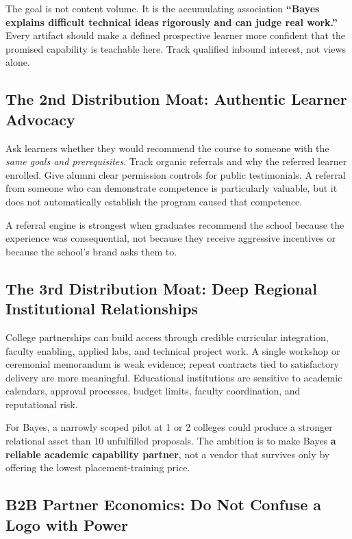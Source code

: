 The goal is not content volume. It is the accumulating association \textbf{``Bayes explains difficult technical ideas rigorously and can judge real work.''} Every artifact should make a defined prospective learner more confident that the promised capability is teachable here. Track qualified inbound interest, not views alone.

\subsection{The 2nd Distribution Moat: Authentic Learner Advocacy}
\label{sec:second_distribution_moat_learner_advocacy}

Ask learners whether they would recommend the course to someone with the \textit{same goals and prerequisites}. Track organic referrals and why the referred learner enrolled. Give alumni clear permission controls for public testimonials. A referral from someone who can demonstrate competence is particularly valuable, but it does not automatically establish the program caused that competence.

A referral engine is strongest when graduates recommend the school because the experience was consequential, not because they receive aggressive incentives or because the school's brand asks them to.

\subsection{The 3rd Distribution Moat: Deep Regional Institutional Relationships}
\label{sec:third_distribution_moat_regional_partnerships}

College partnerships can build access through credible curricular integration, faculty enabling, applied labs, and technical project work. A single workshop or ceremonial memorandum is weak evidence; repeat contracts tied to satisfactory delivery are more meaningful. Educational institutions are sensitive to academic calendars, approval processes, budget limits, faculty coordination, and reputational risk.

For Bayes, a narrowly scoped pilot at 1 or 2 colleges could produce a stronger relational asset than 10 unfulfilled proposals. The ambition is to make Bayes \textbf{a reliable academic capability partner}, not a vendor that survives only by offering the lowest placement-training price.

\subsection{B2B Partner Economics: Do Not Confuse a Logo with Power}
\label{sec:b2b_partner_economics_logo_vs_power}

